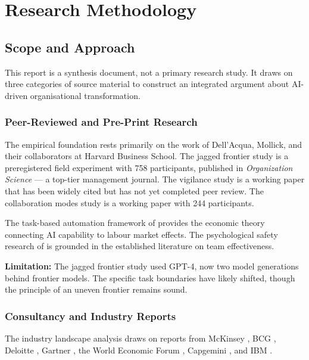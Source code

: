 \chapter{Research Methodology}
\label{ch:methodology}

\section{Scope and Approach}

This report is a synthesis document, not a primary research study. It draws on three categories of source material to construct an integrated argument about AI-driven organisational transformation.

\subsection{Peer-Reviewed and Pre-Print Research}

The empirical foundation rests primarily on the work of Dell'Acqua, Mollick, and their collaborators at Harvard Business School. The jagged frontier study \parencite{DellAcqua2026} is a preregistered field experiment with 758 participants, published in \emph{Organization Science} --- a top-tier management journal. The vigilance study \parencite{DellAcqua2023} is a working paper that has been widely cited but has not yet completed peer review. The collaboration modes study \parencite{Randazzo2024} is a working paper with 244 participants.

The task-based automation framework of \textcite{Acemoglu2019} provides the economic theory connecting AI capability to labour market effects. The psychological safety research of \textcite{EdmondsonLei2025} is grounded in the established literature on team effectiveness.

\textbf{Limitation:} The jagged frontier study used GPT-4, now two model generations behind frontier models. The specific task boundaries have likely shifted, though the principle of an uneven frontier remains sound.

\subsection{Consultancy and Industry Reports}

The industry landscape analysis draws on reports from McKinsey \parencite{McKinseyAgenticOrg2026, McKinseySixShifts2026}, BCG \parencite{BCGAgenticShift2025, BCGAgenticEnterprise2025, BCGAIKPIs2025}, Deloitte \parencite{Deloitte2026}, Gartner \parencite{Gartner2025}, the World Economic Forum \parencite{WEF2025}, Capgemini \parencite{Capgemini2025}, and IBM \parencite{IBM2025}.

